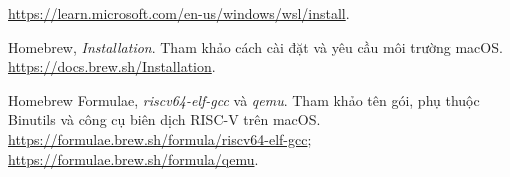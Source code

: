 \documentclass[12pt,a4paper]{article}
\begin{document}
\begin{enumerate}[label={[\arabic*]},itemsep=0.6em]
  \url{https://learn.microsoft.com/en-us/windows/wsl/install}.
  \item Homebrew, \textit{Installation}. Tham khảo cách cài đặt và yêu cầu môi trường macOS.\\
  \url{https://docs.brew.sh/Installation}.
  \item Homebrew Formulae, \textit{riscv64-elf-gcc} và \textit{qemu}. Tham khảo tên gói, phụ thuộc Binutils và công cụ biên dịch RISC-V trên macOS.\\
  \url{https://formulae.brew.sh/formula/riscv64-elf-gcc};\\
  \url{https://formulae.brew.sh/formula/qemu}.
\end{enumerate}
\endgroup
\end{document}
